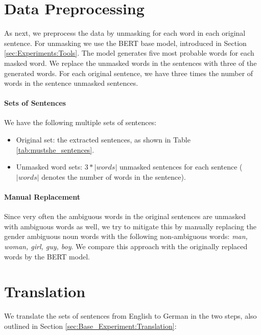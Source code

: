 \section{Data Preprocessing}
\label{sec:Real_Experiment:Preprocessing}

As next, we preprocess the data by unmasking for each word in each original sentence. For unmasking we use the BERT base model, introduced in Section \ref{sec:Experiments:Tools}. The model generates five most probable words for each masked word. We replace the unmasked words in the sentences with three of the generated words. For each original sentence, we have three times the number of words in the sentence unmasked sentences.

\paragraph{Sets of Sentences} We have the following multiple sets of sentences:
\begin{itemize}
    \item Original set: the extracted sentences, as shown in Table \ref{tab:mustshe_sentences}. 
    \item Unmasked word sets: $3*|words|$ unmasked sentences for each sentence ($|words|$ denotes the number of words in the sentence).
\end{itemize}

\paragraph{Manual Replacement} Since very often the ambiguous words in the original sentences are unmasked with ambiguous words as well, we try to mitigate this by manually replacing the gender ambiguous noun words with the following non-ambiguous words: \textit{man, woman, girl, guy, boy}. We compare this approach with the originally replaced words by the BERT model.

\newpage

\section{Translation}
\label{sec:Real_Experiment:Translation}

We translate the sets of sentences from English to German in the two steps, also outlined in Section \ref{sec:Base_Experiment:Translation}:

